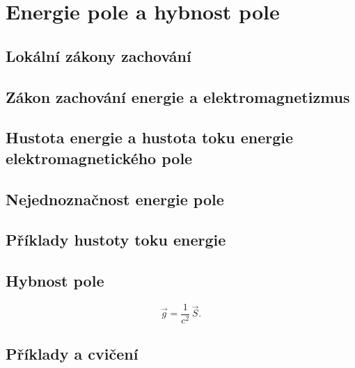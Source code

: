 \setchaptertoc
\chapter{Energie pole a hybnost pole}\label{fyz:IIchapXXVII}

  \section{Lokální zákony zachování}\label{fyz:IIchapXXVIIsecI}
  \section{Zákon zachování energie a elektromagnetizmus}\label{fyz:IIchapXXVIIsecII}
  \section{Hustota energie a hustota toku energie elektromagnetického 
  pole}\label{fyz:IIchapXXVIIsecIII}
  \section{Nejednoznačnost energie pole}\label{fyz:IIchapXXVIIsecIV}
  \section{Příklady hustoty toku energie}\label{fyz:IIchapXXVIIsecV}
  \section{Hybnost pole}\label{fyz:IIchapXXVIIsecVI}
    \begin{equation}\label{fyz:eq957}
      \vec{g}=\frac{1}{c^2}\,\vec{S}.
    \end{equation}
  \section{Příklady a cvičení}\label{fyz:IIchapXXVIIsecVII}




